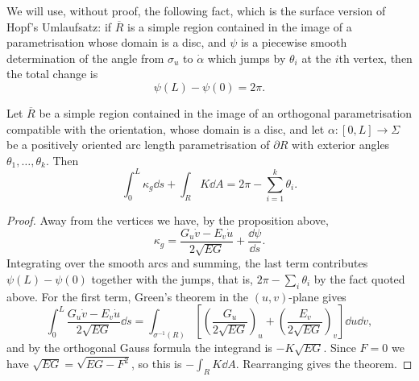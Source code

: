 \begin{center}
\end{center}

We will use, without proof, the following fact, which is the surface version of Hopf's Umlaufsatz: if $\overline R$ is a simple region contained in the image of a parametrisation whose domain is a disc, and $\psi$ is a piecewise smooth determination of the angle from $\sigma_u$ to $\dot\alpha$ which jumps by $\theta_i$ at the $i$th vertex, then the total change is
$$
\psi(L) - \psi(0) = 2\pi.
$$

\begin{theorem}
    Let $\overline R$ be a simple region contained in the image of an orthogonal parametrisation compatible with the orientation, whose domain is a disc, and let $\alpha: [0,L] \rightarrow \Sigma$ be a positively oriented arc length parametrisation of $\partial R$ with exterior angles $\theta_1,\dots,\theta_k$. Then
    $$
    \int_0^L \kappa_g \dd s + \int_R K \dd A = 2\pi - \sum_{i=1}^k \theta_i.
    $$
\end{theorem}
\begin{proof}
    Away from the vertices we have, by the proposition above,
    $$
    \kappa_g = \frac{G_u\dot v - E_v\dot u}{2\sqrt{EG}} + \frac{\dd\psi}{\dd s}.
    $$
    Integrating over the smooth arcs and summing, the last term contributes $\psi(L)-\psi(0)$ together with the jumps, that is, $2\pi - \sum_i\theta_i$ by the fact quoted above. For the first term, Green's theorem in the $(u,v)$-plane gives
    $$
    \int_0^L \frac{G_u\dot v - E_v\dot u}{2\sqrt{EG}}\dd s = \int_{\sigma^{-1}(R)}\left[\left(\frac{G_u}{2\sqrt{EG}}\right)_u + \left(\frac{E_v}{2\sqrt{EG}}\right)_v\right]\dd u \dd v,
    $$
    and by the orthogonal Gauss formula the integrand is $-K\sqrt{EG}$. Since $F = 0$ we have $\sqrt{EG} = \sqrt{EG-F^2}$, so this is $-\int_R K \dd A$. Rearranging gives the theorem.
\end{proof}

